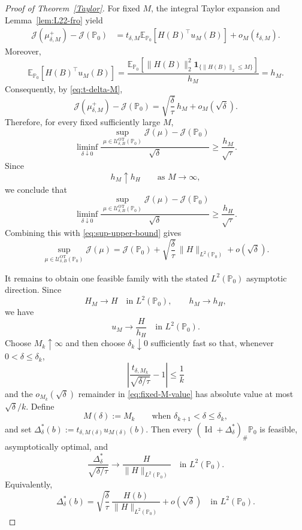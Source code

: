 \documentclass[11pt]{article}
\theoremstyle{definition}
\newcommand{\E}{\mathbb{E}}
\begin{document}
\begin{proof}[Proof of Theorem~\ref{Taylor}]
For fixed $M$, the integral Taylor expansion and
Lemma~\ref{lem:L22-fro} yield
\begin{align*}
\mathcal J(\mu_{\delta,M}^{+})
-
\mathcal J(\mathbb P_0)
&=
t_{\delta,M}
\E_{\mathbb P_0}
\left[
H(B)^\top u_M(B)
\right]
+
o_M(t_{\delta,M}).
\end{align*}
Moreover,
\[
\E_{\mathbb P_0}
\left[
H(B)^\top u_M(B)
\right]
=
\frac{
\E_{\mathbb P_0}
\left[
\|H(B)\|_2^2
\mathbf 1_{\{\|H(B)\|_2\le M\}}
\right]
}{
h_M
}
=
h_M.
\]
Consequently, by \eqref{eq:t-delta-M},
\begin{equation}\label{eq:fixed-M-value}
\mathcal J(\mu_{\delta,M}^{+})
-
\mathcal J(\mathbb P_0)
=
\sqrt{\frac{\delta}{\tau}}\,
h_M
+
o_M(\sqrt{\delta}).
\end{equation}
Therefore, for every fixed sufficiently large $M$,
\[
\liminf_{\delta\downarrow0}
\frac{
\displaystyle
\sup_{\mu\in
\mathcal U_{\delta,B}^{\mathrm{OT}}(\mathbb P_0)}
\mathcal J(\mu)
-
\mathcal J(\mathbb P_0)
}{
\sqrt{\delta}
}
\ge
\frac{h_M}{\sqrt{\tau}}.
\]
Since
\[
h_M\uparrow h_H
\qquad
\text{as }M\to\infty,
\]
we conclude that
\[
\liminf_{\delta\downarrow0}
\frac{
\displaystyle
\sup_{\mu\in
\mathcal U_{\delta,B}^{\mathrm{OT}}(\mathbb P_0)}
\mathcal J(\mu)
-
\mathcal J(\mathbb P_0)
}{
\sqrt{\delta}
}
\ge
\frac{h_H}{\sqrt{\tau}}.
\]
Combining this with \eqref{eq:sup-upper-bound} gives
\[
\sup_{\mu\in
\mathcal U_{\delta,B}^{\mathrm{OT}}(\mathbb P_0)}
\mathcal J(\mu)
=
\mathcal J(\mathbb P_0)
+
\sqrt{\frac{\delta}{\tau}}\,
\|H\|_{L^2(\mathbb P_0)}
+
o(\sqrt{\delta}).
\]

It remains to obtain one feasible family with the stated
$L^2(\mathbb P_0)$ asymptotic direction. Since
\[
H_M\longrightarrow H
\quad\text{in }L^2(\mathbb P_0),
\qquad
h_M\longrightarrow h_H,
\]
we have
\[
u_M
\longrightarrow
\frac{H}{h_H}
\quad\text{in }L^2(\mathbb P_0).
\]
Choose $M_k\uparrow\infty$ and then choose
$\delta_k\downarrow0$ sufficiently fast so that, whenever
$0<\delta\le\delta_k$,
\[
\left|
\frac{t_{\delta,M_k}}
{\sqrt{\delta/\tau}}
-1
\right|
\le
\frac1k
\]
and the $o_{M_k}(\sqrt{\delta})$ remainder in
\eqref{eq:fixed-M-value} has absolute value at most
$\sqrt{\delta}/k$. Define
\[
M(\delta):=M_k
\qquad
\text{when }
\delta_{k+1}<\delta\le\delta_k,
\]
and set $\Delta_\delta^*(b)
:=
t_{\delta,M(\delta)}
u_{M(\delta)}(b).$
Then every $(\operatorname{Id}+\Delta_\delta^*)_\#
\mathbb P_0$
is feasible, asymptotically optimal, and
\[
\frac{\Delta_\delta^*}
{\sqrt{\delta/\tau}}
\longrightarrow
\frac{H}{\|H\|_{L^2(\mathbb P_0)}}
\quad
\text{in }L^2(\mathbb P_0).
\]
Equivalently,
\[
\Delta_\delta^*(b)
=
\sqrt{\frac{\delta}{\tau}}\,
\frac{H(b)}
{\|H\|_{L^2(\mathbb P_0)}}
+
o(\sqrt{\delta})
\quad
\text{in }L^2(\mathbb P_0).
\]


\end{proof}
\end{document}
